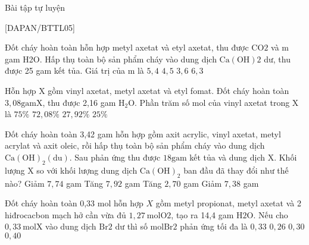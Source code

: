 \begin{bttl}{Bài tập tự luyện}
\end{bttl}
[DAPAN/BTTL05]

\begin{ex}[2][(Đề MH - 2018)]
Đốt cháy hoàn toàn hỗn hợp metyl axetat và etyl axetat, thu được $\mathrm{CO} 2$ và $\mathrm{m}$ gam H2O. Hấp thụ toàn bộ sản phẩm cháy vào dung dịch $\mathrm{Ca}(\mathrm{OH}) 2$ dư, thu được 25 gam kết tủa. Giá trị của m là
	\choice
{%
	 $ 5,4 $
}
{%
\True	$ 4,5 $
}
{%
	$ 3,6 $
}
{%
	$ 6,3 $
}	
\sodongkeex[5]
\end{ex}
\begin{ex}[2][(Đề TSĐH B - 2011)]
	Hỗn hợp X gồm vinyl axetat, metyl axetat và etyl fomat. Đốt cháy hoàn toàn $3,08 \mathrm{gam} \mathrm{X}$, thu được 2,16 gam $\mathrm{H}_2 \mathrm{O}$. Phần trăm số mol của vinyl axetat trong $\mathrm{X}$ là
	\choice
	{%
		$75 \%$
	}
	{%
		$72,08 \%$
	}
	{%
		$27,92 \%$
	}
	{%
		\True $25 \%$
	}	
	\sodongkeex[5]
\end{ex}
\begin{ex}[2][(Đề TSĐH A - 2011)]
	Đốt cháy hoàn toàn 3,42 gam hỗn hợp gồm axit acrylic, vinyl axetat, metyl acrylat và axit oleic, rồi hấp thụ toàn bộ sản phẩm cháy vào dung dịch $\mathrm{Ca}(\mathrm{OH})_2(\mathrm{du})$. Sau phản ứng thu được $18 \mathrm{gam}$ kết tủa và dung dịch $\mathrm{X}$. Khối lượng $\mathrm{X}$ so với khối lượng dung dịch $\mathrm{Ca}(\mathrm{OH})_2$ ban đầu đã thay đổi như thế nào?
	\choice
	{%
		Giảm $ 7,74 $ gam
	}
	{%
	 Tăng $ 7,92 $ gam
	}
	{%
		Tăng $ 2,70 $ gam
	}
	{%
	\True 	Giảm $ 7,38 $ gam
	}	
	\sodongkeex[5]
\end{ex}
\begin{ex}[2][(Đề THPT QG - 2016)]
	Đốt cháy hoàn toàn 0,33 mol hỗn hợp $X$ gồm metyl propionat, metyl axetat và 2 hiđrocacbon mạch hở cần vừa đủ $1,27 \mathrm{~mol} \mathrm{O} 2$, tạo ra 14,4 gam $\mathrm{H} 2 \mathrm{O}$. Nếu cho $0,33 \mathrm{~mol} \mathrm{X}$ vào dung dịch $\mathrm{Br} 2$ dư thì số $\mathrm{mol} \mathrm{Br} 2$ phản ứng tối đa là
	\choice
	{%
		$ 0,33 $
	}
	{%
		$ 0,26 $
	}
	{%
		$ 0,30 $
	}
	{%
		\True $ 0,40 $
	}	
	\sodongkeex[5]
\end{ex}

